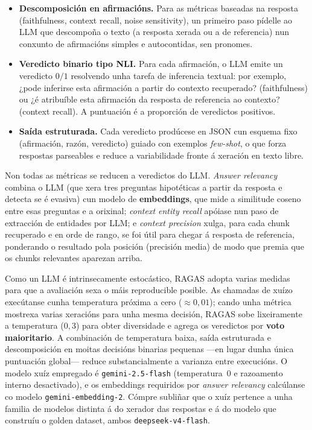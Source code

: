 \documentclass[11pt, a4paper, oneside]{report}
\begin{document}
\begin{itemize}
  \item \textbf{Descomposición en afirmacións.} Para as métricas baseadas na resposta
    (faithfulness, context recall, noise sensitivity), un primeiro paso pídelle ao LLM
    que descompoña o texto (a resposta xerada ou a de referencia) nun conxunto de
    afirmacións simples e autocontidas, sen pronomes.
  \item \textbf{Veredicto binario tipo NLI.} Para cada afirmación, o LLM emite un
    veredicto $0/1$ resolvendo unha tarefa de inferencia textual: por exemplo,
    ¿pode inferirse esta afirmación a partir do contexto recuperado? (faithfulness) ou
    ¿é atribuíble esta afirmación da resposta de referencia ao contexto? (context recall).
    A puntuación é a proporción de veredictos positivos.
  \item \textbf{Saída estruturada.} Cada veredicto prodúcese en JSON cun esquema fixo
    (afirmación, razón, veredicto) guiado con exemplos \textit{few-shot}, o que forza
    respostas parseables e reduce a variabilidade fronte á xeración en texto libre.
\end{itemize}

Non todas as métricas se reducen a veredictos do LLM. \textit{Answer relevancy} combina
o LLM (que xera tres preguntas hipotéticas a partir da resposta e detecta se é evasiva)
cun modelo de \textbf{embeddings}, que mide a similitude coseno entre esas preguntas e a
orixinal; \textit{context entity recall} apóiase nun paso de extracción de entidades por
LLM; e \textit{context precision} xulga, para cada chunk recuperado e en orde de rango,
se foi útil para chegar á resposta de referencia, ponderando o resultado pola posición
(precisión media) de modo que premia que os chunks relevantes aparezan arriba.

Como un LLM é intrinsecamente estocástico, RAGAS adopta varias
medidas para que a avaliación sexa o máis reproducible posible. As chamadas de xuízo
execútanse cunha temperatura próxima a cero ($\approx 0{,}01$); cando unha métrica
mostrexa varias xeracións para unha mesma decisión, RAGAS sobe lixeiramente a temperatura
($0{,}3$) para obter diversidade e agrega os veredictos por \textbf{voto maioritario}. A
combinación de temperatura baixa, saída estruturada e descomposición en moitas decisións
binarias pequenas —en lugar dunha única puntuación global— reduce substancialmente a
varianza entre execucións. O modelo xuíz empregado é \texttt{gemini-2.5-flash}
(temperatura~0 e razoamento interno desactivado), e os embeddings requiridos por
\textit{answer relevancy} calcúlanse co modelo \texttt{gemini-embedding-2}. Cómpre
subliñar que o xuíz pertence a unha familia de modelos distinta á do xerador das
respostas e á do modelo que construíu o golden dataset, ambos \texttt{deepseek-v4-flash}.
\end{document}
